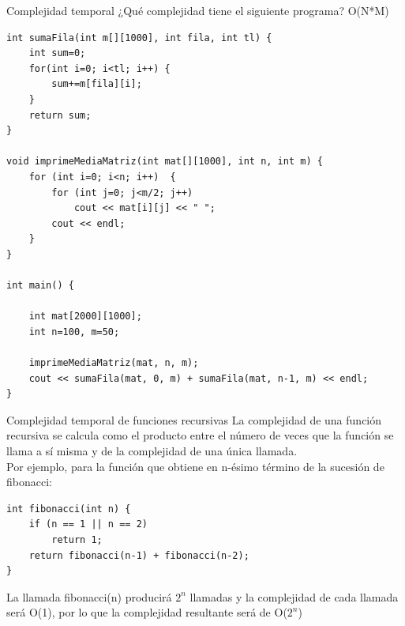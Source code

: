 \documentclass[12pt]{beamer}
\begin{document}
\begin{frame}[fragile]{Complejidad temporal}
    \centering ¿Qué complejidad tiene el siguiente programa? O(\alert{N*M}) \\
    \medskip
\begin{lstlisting}[basicstyle=\tiny]
int sumaFila(int m[][1000], int fila, int tl) {
    int sum=0;
    for(int i=0; i<tl; i++) {
        sum+=m[fila][i];
    }
    return sum;
}

void imprimeMediaMatriz(int mat[][1000], int n, int m) {
    for (int i=0; i<n; i++)  {
        for (int j=0; j<m/2; j++)
            cout << mat[i][j] << " ";
        cout << endl;
    }
}

int main() {

    int mat[2000][1000];
    int n=100, m=50;
    
    imprimeMediaMatriz(mat, n, m);
    cout << sumaFila(mat, 0, m) + sumaFila(mat, n-1, m) << endl;
}
\end{lstlisting}
\end{frame}

\begin{frame}[fragile]{Complejidad temporal de funciones recursivas}
    La complejidad de una función recursiva se calcula como el producto entre el número de veces que la función se llama a sí misma y de la complejidad de una única llamada. \\
    \medskip
    Por ejemplo, para la función que obtiene en n-ésimo término de la sucesión de fibonacci:
\begin{lstlisting}
int fibonacci(int n) {
    if (n == 1 || n == 2)
        return 1;
    return fibonacci(n-1) + fibonacci(n-2);
}        
\end{lstlisting}
La llamada fibonacci(n) producirá $2^n$ llamadas y la complejidad de cada llamada será O(\alert{1}), por lo que la complejidad resultante será de O(\alert{$2^n$})
\end{frame}
\end{document}

